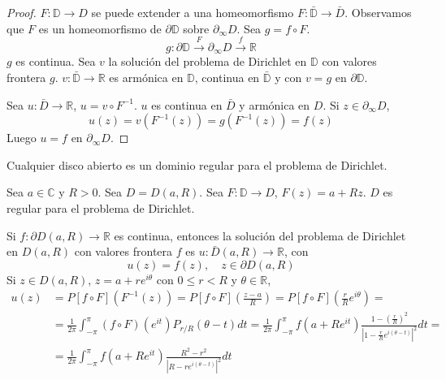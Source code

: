 \begin{proof}
    $F: \mathbb{D} \to D$ se puede extender a una homeomorfismo $F: \bar{\mathbb{D}} \to \bar{D}$.
    Observamos que $F$ es un homeomorfismo de $\partial\mathbb{D}$ sobre $\partial_\infty D$.
    Sea $g = f \circ F$.
    $$g: \partial\mathbb{D} \xrightarrow{F} \partial_\infty D \xrightarrow{f} \mathbb{R}$$
    $g$ es continua.
    Sea $v$ la solución del problema de Dirichlet en $\mathbb{D}$ con valores frontera $g$.
    $v: \bar{\mathbb{D}} \to \mathbb{R}$ es armónica en $\mathbb{D}$, continua en $\bar{\mathbb{D}}$ y con $v = g$ en $\partial\mathbb{D}$.

    Sea $u: \bar{D} \to \mathbb{R}$, $u = v \circ F^{-1}$.
    $u$ es continua en $\bar{D}$ y armónica en $D$.
    Si $z \in \partial_\infty D$,
    $$u(z) = v(F^{-1}(z)) = g(F^{-1}(z)) = f(z)$$
    Luego $u = f$ en $\partial_\infty D$.
\end{proof}

\begin{example}
    Cualquier disco abierto es un dominio regular para el problema de Dirichlet.

    Sea $a \in \mathbb{C}$ y $R > 0$.
    Sea $D = D(a, R)$.
    Sea $F: \mathbb{D} \to D$, $F(z) = a + Rz$.
    $D$ es regular para el problema de Dirichlet.

    Si $f: \partial D(a, R) \to \mathbb{R}$ es continua, entonces la solución del problema de Dirichlet en $D(a, R)$ con valores frontera $f$ es $u: \bar{D}(a, R) \to \mathbb{R}$, con
    $$u(z) = f(z), \quad z \in \partial D(a, R)$$
    Si $z \in D(a, R)$, $z = a + re^{i\theta}$ con $0 \leq r < R$ y $\theta \in \mathbb{R}$,
    \begin{align*}
        u(z) & = P[f \circ F](F^{-1}(z)) = P[f \circ F]\left(\frac{z-a}{R}\right) = P[f \circ F]\left(\frac{r}{R}e^{i\theta}\right) =                                                                                      \\
             & = \frac{1}{2\pi} \int_{-\pi}^\pi (f \circ F)(e^{it})P_{r/R}(\theta-t)dt = \frac{1}{2\pi} \int_{-\pi}^\pi f(a + Re^{it})\frac{1-\left(\frac{r}{R}\right)^2}{\left|1-\frac{r}{R}e^{i(\theta-t)}\right|^2}dt = \\
             & = \frac{1}{2\pi} \int_{-\pi}^\pi f(a + Re^{it})\frac{R^2-r^2}{|R-re^{i(\theta-t)}|^2}dt
    \end{align*}
\end{example}

